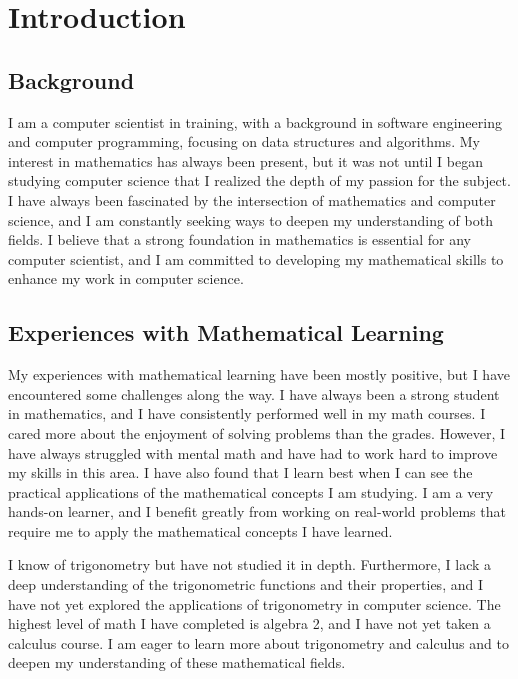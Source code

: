 \section{Introduction}

\subsection{Background}

I am a computer scientist in training, with a background in software engineering and computer programming, focusing on data structures and algorithms. My interest in mathematics has always been present, but it was not until I began studying computer science that I realized the depth of my passion for the subject. I have always been fascinated by the intersection of mathematics and computer science, and I am constantly seeking ways to deepen my understanding of both fields. I believe that a strong foundation in mathematics is essential for any computer scientist, and I am committed to developing my mathematical skills to enhance my work in computer science.

\subsection{Experiences with Mathematical Learning}

My experiences with mathematical learning have been mostly positive, but I have encountered some challenges along the way. I have always been a strong student in mathematics, and I have consistently performed well in my math courses. I cared more about the enjoyment of solving problems than the grades. However, I have always struggled with mental math and have had to work hard to improve my skills in this area. I have also found that I learn best when I can see the practical applications of the mathematical concepts I am studying. I am a very hands-on learner, and I benefit greatly from working on real-world problems that require me to apply the mathematical concepts I have learned.

I know of trigonometry but have not studied it in depth. Furthermore, I lack a deep understanding of the trigonometric functions and their properties, and I have not yet explored the applications of trigonometry in computer science. The highest level of math I have completed is algebra 2, and I have not yet taken a calculus course. I am eager to learn more about trigonometry and calculus and to deepen my understanding of these mathematical fields.

